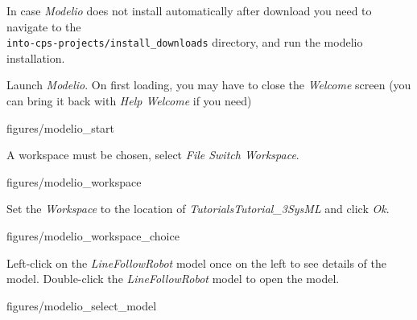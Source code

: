 \documentclass[11pt,a4paper]{../tutorial}
\begin{document}
\begin{instructions}

\item In case \emph{Modelio} does not install automatically after download you need to navigate to the \\	\texttt{into-cps-projects/install\_downloads} directory, and run the modelio installation.

\item Launch \emph{Modelio}. On first loading, you may have to close the \emph{Welcome} screen (you can bring it back with \emph{Help \menusep Welcome} if you need)

\begin{annotation}[width=1\linewidth,trim=0 400 0 0,clip]{figures/modelio_start}
    \end{annotation}

\item A workspace must be chosen, select \emph{File \menusep Switch Workspace}.

\begin{annotation}[width=1\linewidth,trim=0 700 0 0,clip]{figures/modelio_workspace}
    \end{annotation}
\newpage

\item Set the \emph{Workspace} to the location of \emph{Tutorials\pathsep{}Tutorial\_3\pathsep{}SysML} and click \emph{Ok}.

\begin{annotation}[width=0.5\linewidth,trim=0 0 0 0,clip]{figures/modelio_workspace_choice}
    \end{annotation}

\item Left-click on the \emph{LineFollowRobot} model once on the left to see details of the model. Double-click the \emph{LineFollowRobot} model to open the model.

    \begin{annotation}[width=1\linewidth,trim=0 300 0 0,clip]{figures/modelio_select_model}
    \end{annotation}


\end{instructions}
\end{document}
